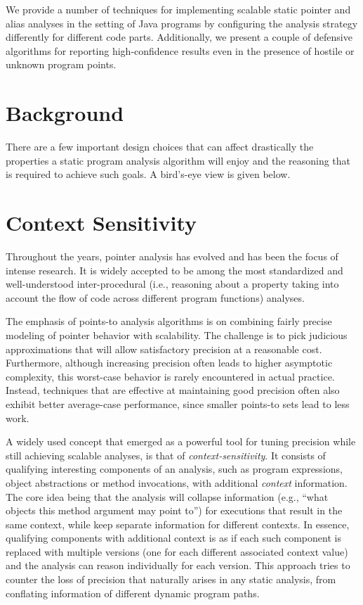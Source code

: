 We provide a number of techniques for implementing scalable static pointer and alias analyses in the setting of Java programs by configuring the analysis strategy differently for different code parts. Additionally, we present a couple of defensive algorithms for reporting high-confidence results even in the presence of hostile or unknown program points.


\section*{Background}
There are a few important design choices that can affect drastically the properties a static program analysis algorithm will enjoy and the reasoning that is required to achieve such goals. A bird's-eye view is given below.

\section{Context Sensitivity}

Throughout the years, pointer analysis has evolved and has been the focus of intense research. It is widely accepted to be among the most standardized and well-understood inter-procedural (i.e., reasoning about a property taking into account the flow of code across different program functions) analyses.

The emphasis of points-to analysis algorithms is on combining fairly precise modeling of pointer behavior with scalability. The challenge is to pick judicious approximations that will allow satisfactory precision at a reasonable cost. Furthermore, although increasing precision often leads to higher asymptotic complexity, this worst-case behavior is rarely encountered in actual practice. Instead, techniques that are effective at maintaining good precision often also exhibit better average-case performance, since smaller points-to sets lead to less work.

A widely used concept that emerged as a powerful tool for tuning precision while still achieving scalable analyses, is that of \emph{context-sensitivity}. It consists of qualifying interesting components of an analysis, such as program expressions, object abstractions or method invocations, with additional \emph{context} information. The core idea being that the analysis will collapse information (e.g., ``what objects this method argument may point to'') for executions that result in the same context, while keep separate information for different contexts. In essence, qualifying components with additional context is as if each such component is replaced with multiple versions (one for each different associated context value) and the analysis can reason individually for each version. This approach tries to counter the loss of precision that naturally arises in any static analysis, from conflating information of different dynamic program paths.

